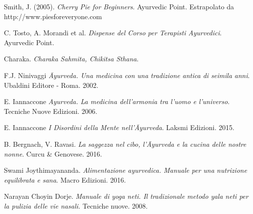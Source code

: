 
\begin{thebibliography}{3} 




 Smith, J. (2005). \textit{Cherry Pie for Beginners}. Ayurvedic Point. Estrapolato da http://www.piesforeveryone.com



 C. Tosto, A. Morandi et al. \textit{Dispense del Corso per Terapisti Ayurvedici}. Ayurvedic Point.

 Charaka. \textit{Charaka Sahmita, Chikitsa Sthana}.


 F.J. Ninivaggi \textit{\={A}yurveda. Una medicina con una tradizione antica di seimila anni}. Ubaldini Editore - Roma. 2002.

 E. Iannaccone \textit{Ayurveda. La medicina dell'armonia tra l'uomo e l'universo}. Tecniche Nuove Edizioni. 2006.

 E. Iannaccone \textit{I Disordini della Mente nell'\={A}yurveda}. Laksmi Edizioni. 2015.



 B. Bergnach, V. Ravasi. \textit{La saggezza nel cibo, l'\={A}yurveda e la cucina delle nostre nonne}. Curcu \& Genovese. 2016. 

 Swami Joythimayananda. \textit{Alimentazione ayurvedica. Manuale per una nutrizione equilibrata e sana}. Macro Edizioni. 2016. 




 Narayan Choyin Dorje. \textit{Manuale di yoga neti. Il tradizionale metodo yala neti per la pulizia delle vie nasali.} Tecniche nuove. 2008.



\end{thebibliography}
